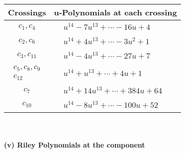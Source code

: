 \documentclass[1p]{elsarticle_modified}
\theoremstyle{definition}
\begin{document}
\begin{tabular}{m{50pt}|m{274pt}}
Crossings & \hspace{64pt}u-Polynomials at each crossing \\
\hline $$\begin{aligned}c_{1},c_{4}\end{aligned}$$&$\begin{aligned}
&u^{14}-7 u^{13}+\cdots-16 u+4
\end{aligned}$\\
\hline $$\begin{aligned}c_{2},c_{6}\end{aligned}$$&$\begin{aligned}
&u^{14}+4 u^{13}+\cdots-3 u^2+1
\end{aligned}$\\
\hline $$\begin{aligned}c_{3},c_{11}\end{aligned}$$&$\begin{aligned}
&u^{14}-4 u^{13}+\cdots-27 u+7
\end{aligned}$\\
\hline $$\begin{aligned}c_{5},c_{8},c_{9}\\c_{12}\end{aligned}$$&$\begin{aligned}
&u^{14}+u^{13}+\cdots+4 u+1
\end{aligned}$\\
\hline $$\begin{aligned}c_{7}\end{aligned}$$&$\begin{aligned}
&u^{14}+14 u^{13}+\cdots+384 u+64
\end{aligned}$\\
\hline $$\begin{aligned}c_{10}\end{aligned}$$&$\begin{aligned}
&u^{14}-8 u^{13}+\cdots-100 u+52
\end{aligned}$\\
\hline
\end{tabular}\\~\\
\newpage\renewcommand{\arraystretch}{1}
\flushleft \textbf{(v) Riley Polynomials at the component}\newline \\
\end{document}
